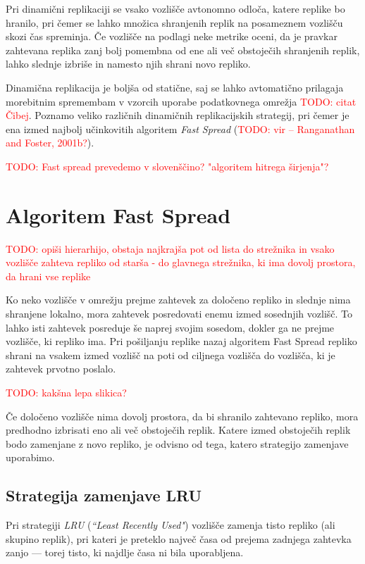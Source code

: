 \documentclass[a4paper, 12pt]{book}
\newcommand{\newterm}{\textit}
\newcommand{\TODO}[1]{\textcolor{red}{TODO: #1}}
\begin{document}
Pri dinamični replikaciji se vsako vozlišče avtonomno odloča, katere
replike bo hranilo, pri čemer se lahko množica shranjenih replik na
posameznem vozlišču skozi čas spreminja. Če vozlišče na podlagi neke
metrike oceni, da je pravkar zahtevana replika zanj bolj pomembna od ene
ali več obstoječih shranjenih replik, lahko slednje izbriše in namesto
njih shrani novo repliko.

Dinamična replikacija je boljša od statične, saj se lahko avtomatično
prilagaja morebitnim spremembam v vzorcih uporabe podatkovnega omrežja
\TODO{citat Čibej}. Poznamo veliko različnih dinamičnih replikacijskih
strategij, pri čemer je ena izmed najbolj učinkovitih algoritem
\newterm{Fast Spread} (\TODO{vir -- Ranganathan and Foster, 2001b?}).

\TODO{Fast spread prevedemo v slovenščino? "algoritem hitrega širjenja"?}


\section{Algoritem Fast Spread}

\TODO{opiši hierarhijo, obstaja najkrajša pot od lista do strežnika in
vsako vozlišče zahteva repliko od starša - do glavnega strežnika, ki
ima dovolj prostora, da hrani vse replike}

Ko neko vozlišče v omrežju prejme zahtevek za določeno repliko in slednje
nima shranjene lokalno, mora zahtevek posredovati enemu izmed sosednjih
vozlišč. To lahko isti zahtevek posreduje še naprej svojim sosedom, dokler
ga ne prejme vozlišče, ki repliko ima. Pri pošiljanju replike nazaj
algoritem Fast Spread repliko shrani na vsakem izmed vozlišč na poti od
ciljnega vozlišča do vozlišča, ki je zahtevek prvotno poslalo.

\TODO{kakšna lepa slikica?}

Če določeno vozlišče nima dovolj prostora, da bi shranilo zahtevano repliko,
mora predhodno izbrisati eno ali več obstoječih replik. Katere izmed
obstoječih replik bodo zamenjane z novo repliko, je odvisno od tega, katero
strategijo zamenjave uporabimo.

\subsection{Strategija zamenjave LRU}

Pri strategiji \newterm{LRU} (\newterm{``Least Recently Used"}) vozlišče
zamenja tisto repliko (ali skupino replik), pri kateri je preteklo največ
časa od prejema zadnjega zahtevka zanjo --- torej tisto, ki najdlje časa
ni bila uporabljena.
\end{document}
